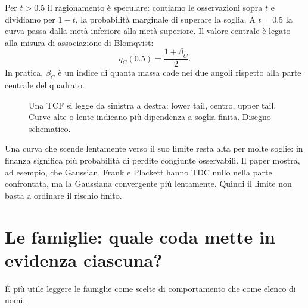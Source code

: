 \documentclass[11pt,a4paper]{article}
\begin{document}
Per $t>0.5$ il ragionamento è speculare: contiamo le osservazioni sopra $t$ e
dividiamo per $1-t$, la probabilità marginale di superare la soglia. A $t=0.5
$ la curva passa dalla metà inferiore alla metà superiore. Il valore centrale
è legato alla misura di associazione di Blomqvist:
\begin{equation}
 q_C(0.5)=\frac{1+\beta_C}{2}.
 \label{eq:blomqvist}
\end{equation}
In pratica, $\beta_C$ è un indice di quanta massa cade nei due angoli rispetto
alla parte centrale del quadrato.

\begin{figure}[ht]
\centering
{}
\caption{Una TCF si legge da sinistra a destra: lower tail, centro, upper tail. Curve alte o lente indicano più dipendenza a soglia finita. Disegno schematico.}
\label{fig:tcf-reading}
\end{figure}

Una curva che scende lentamente verso il suo limite resta alta per molte
soglie: in finanza significa più probabilità di perdite congiunte osservabili.
Il paper mostra, ad esempio, che Gaussian, Frank e Plackett hanno TDC nullo
nella parte confrontata, ma la Gaussiana convergente più lentamente. Quindi il
limite non basta a ordinare il rischio finito.

\section{Le famiglie: quale coda mette in evidenza ciascuna?}

È più utile leggere le famiglie come scelte di comportamento che come elenco di
nomi.
\end{document}
